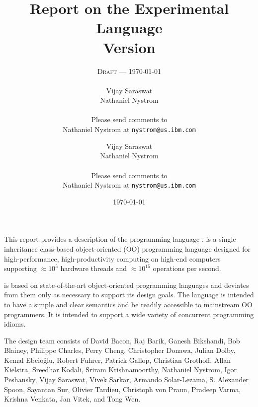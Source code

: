 
\thispagestyle{empty}


\title{Report on the Experimental Language \Xten \\
\large Version \integerversion}
\ifdraft
\author{\textsc{Draft} --- \today \\
\\
Vijay Saraswat \\
Nathaniel Nystrom \\
\\
Please send comments to \\
Nathaniel Nystrom at \texttt{nystrom@us.ibm.com}}
\else
\author{
Vijay Saraswat \\
Nathaniel Nystrom \\
\\
Please send comments to \\
Nathaniel Nystrom at \texttt{nystrom@us.ibm.com}}
\fi
\date{\today}

\maketitle

\newcommand\authorsc[1]{#1}

This report provides a description of the programming
language \Xten. \Xten{} is a single-inheritance class-based object-oriented
(OO) programming language designed for high-performance, high-productivity
computing on high-end computers supporting $\approx 10^5$ hardware threads
and $\approx 10^{15}$ operations per second. 

{}\Xten{} is based on state-of-the-art object-oriented programming
languages and deviates from them only as necessary to support its
design goals. The language is intended to have a simple and clear
semantics and be readily accessible to mainstream OO programmers. It
is intended to support a wide variety of concurrent programming
idioms.


The \Xten{} design team consists of
\authorsc{David Bacon}, 
\authorsc{Raj Barik}, 
\authorsc{Ganesh Bikshandi}, 
\authorsc{Bob Blainey}, 
\authorsc{Philippe Charles}, 
\authorsc{Perry Cheng}, 
\authorsc{Christopher Donawa}, 
\authorsc{Julian Dolby}, 
\authorsc{Kemal Ebcio\u{g}lu},
\authorsc{Robert Fuhrer},
\authorsc{Patrick Gallop}, 
\authorsc{Christian Grothoff}, 
\authorsc{Allan Kielstra}, 
\authorsc{Sreedhar Kodali}, 
\authorsc{Sriram Krishnamoorthy}, 
\authorsc{Nathaniel Nystrom},
\authorsc{Igor Peshansky}, 
\authorsc{Vijay Saraswat},
\authorsc{Vivek Sarkar},
\authorsc{Armando Solar-Lezama},  
\authorsc{S. Alexander Spoon}, 
\authorsc{Sayantan Sur}, 
\authorsc{Olivier Tardieu},
\authorsc{Christoph von Praun},
\authorsc{Pradeep Varma},
\authorsc{Krishna Venkata},
\authorsc{Jan Vitek}, and
\authorsc{Tong Wen}.

